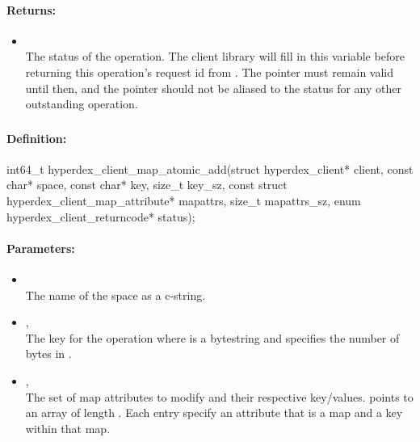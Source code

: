 \paragraph{Returns:}
\begin{itemize}[noitemsep]
\item {}\\
The status of the operation.  The client library will fill in this variable before returning this operation's request id from .  The pointer must remain valid until then, and the pointer should not be aliased to the status for any other outstanding operation.
\end{itemize}

\pagebreak
\subsubsection{}
\label{api:c:map_atomic_add}


\paragraph{Definition:}
\begin{ccode}
int64_t hyperdex_client_map_atomic_add(struct hyperdex_client* client,
        const char* space,
        const char* key, size_t key_sz,
        const struct hyperdex_client_map_attribute* mapattrs, size_t mapattrs_sz,
        enum hyperdex_client_returncode* status);
\end{ccode}

\paragraph{Parameters:}
\begin{itemize}[noitemsep]
\item {}\\
The name of the space as a c-string.
\item {}, \\
The key for the operation where  is a bytestring and  specifies the number of bytes in .
\item {}, \\
The set of map attributes to modify and their respective key/values.   points to an array of length .  Each entry specify an attribute that is a map and a key within that map.
\end{itemize}

